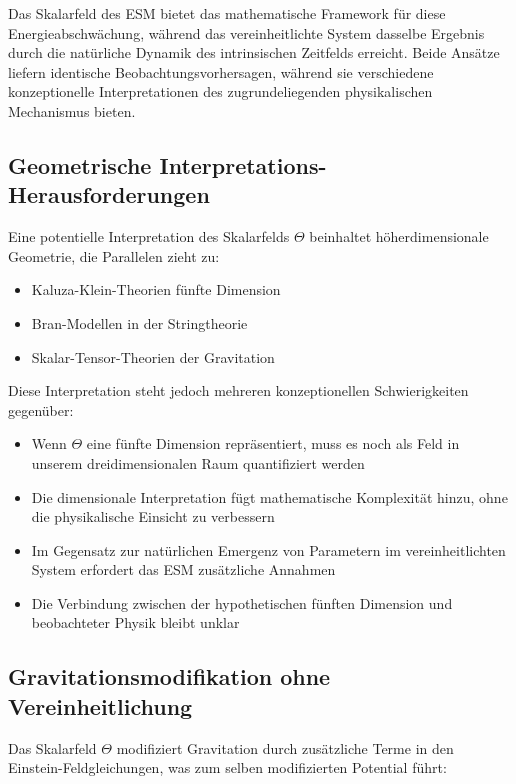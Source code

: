 \documentclass[12pt,a4paper]{article}
\begin{document}
	Das Skalarfeld des ESM bietet das mathematische Framework für diese Energieabschwächung, während das vereinheitlichte System dasselbe Ergebnis durch die natürliche Dynamik des intrinsischen Zeitfelds erreicht. Beide Ansätze liefern identische Beobachtungsvorhersagen, während sie verschiedene konzeptionelle Interpretationen des zugrundeliegenden physikalischen Mechanismus bieten.
	
	\subsection{Geometrische Interpretations-Herausforderungen}
	\label{subsec:geometrical_challenges}
	
	Eine potentielle Interpretation des Skalarfelds $\Theta$ beinhaltet höherdimensionale Geometrie, die Parallelen zieht zu:
	
	\begin{itemize}
		\item Kaluza-Klein-Theorien fünfte Dimension
		\item Bran-Modellen in der Stringtheorie
		\item Skalar-Tensor-Theorien der Gravitation
	\end{itemize}
	
	Diese Interpretation steht jedoch mehreren konzeptionellen Schwierigkeiten gegenüber:
	
	\begin{itemize}
		\item Wenn $\Theta$ eine fünfte Dimension repräsentiert, muss es noch als Feld in unserem dreidimensionalen Raum quantifiziert werden
		\item Die dimensionale Interpretation fügt mathematische Komplexität hinzu, ohne die physikalische Einsicht zu verbessern
		\item Im Gegensatz zur natürlichen Emergenz von Parametern im vereinheitlichten System erfordert das ESM zusätzliche Annahmen
		\item Die Verbindung zwischen der hypothetischen fünften Dimension und beobachteter Physik bleibt unklar
	\end{itemize}
	
	\subsection{Gravitationsmodifikation ohne Vereinheitlichung}
	\label{subsec:gravitational_modification_esm}
	
	Das Skalarfeld $\Theta$ modifiziert Gravitation durch zusätzliche Terme in den Einstein-Feldgleichungen, was zum selben modifizierten Potential führt:
	
\end{document}
